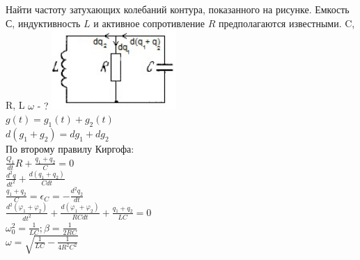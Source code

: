 {
	Найти частоту затухающих колебаний контура, показанного на рисунке. Емкость $С$, индуктивность $L$ и активное сопротивление $R$ предполагаются известными.
}
{%
C, R, L
}
{%
 $\omega$ - ?
}
{%
	\includegraphics[height=30mm]{3_140.jpg}\\
	
	$g(t)={g}_{1}(t) + {g}_{2}(t)$\\
	$d({g}_{1}+{g}_{2})=d{g}_{1} + d{g}_{2}$\\
	По второму правилу Киргофа:\\
	$\frac{{Q}_{1}}{dt}R + \frac{{q}_{1}+{q}_{2}}{C}=0$\\
	$\frac{d^2q}{dt^2}+\frac{d({q}_{1}+{q}_{2})}{Cdt}$\\
	$\frac{{q}_{1}+{q}_{2}}{C}={\epsilon}_{C}=-\frac{d^2{q}_{2}}{dt}$\\
	$\frac{d^2({\varphi}_{1}+{\varphi}_{2})}{dt^2}+\frac{d({\varphi}_{1}+{\varphi}_{2})}{RCdt}+\frac{{q}_{1}+{q}_{2}}{LC}=0$\\
	${\omega}_{0}^2=\frac{1}{LC}; \beta = \frac{1}{2RC}$\\
	$\omega=\sqrt{\frac{1}{LC} - \frac{1}{4R^2C^2}}$\\
}

